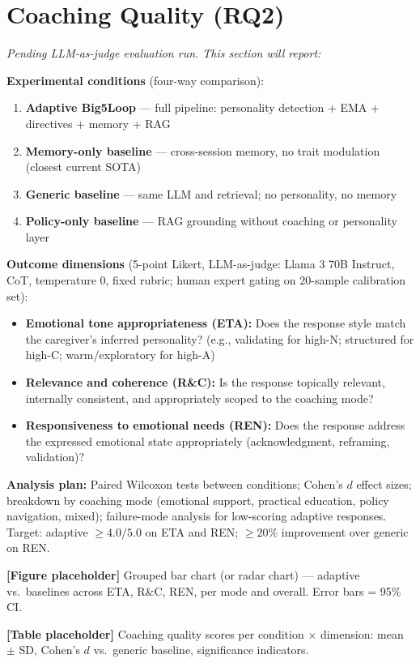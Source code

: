 \documentclass[10pt,a4paper]{report}
\begin{document}
\section{Coaching Quality (RQ2)}

\begin{tcolorbox}[colback=yellow!8!white, colframe=orange!70!black, title=\textbf{Placeholder --- Coaching Quality Evaluation (RQ2)}, fonttitle=\bfseries, left=4pt, right=4pt, top=4pt, bottom=4pt]
\textit{Pending LLM-as-judge evaluation run. This section will report:}

\textbf{Experimental conditions} (four-way comparison):
\begin{enumerate}[leftmargin=*, nosep]
  \item \textbf{Adaptive Big5Loop} --- full pipeline: personality detection + EMA + directives + memory + RAG
  \item \textbf{Memory-only baseline} --- cross-session memory, no trait modulation (closest current SOTA)
  \item \textbf{Generic baseline} --- same LLM and retrieval; no personality, no memory
  \item \textbf{Policy-only baseline} --- RAG grounding without coaching or personality layer
\end{enumerate}

\textbf{Outcome dimensions} (5-point Likert, LLM-as-judge: Llama 3 70B Instruct, CoT, temperature 0, fixed rubric; human expert gating on 20-sample calibration set):
\begin{itemize}[leftmargin=*, nosep]
  \item \textbf{Emotional tone appropriateness (ETA):} Does the response style match the caregiver's inferred personality? (e.g., validating for high-N; structured for high-C; warm/exploratory for high-A)
  \item \textbf{Relevance and coherence (R\&C):} Is the response topically relevant, internally consistent, and appropriately scoped to the coaching mode?
  \item \textbf{Responsiveness to emotional needs (REN):} Does the response address the expressed emotional state appropriately (acknowledgment, reframing, validation)?
\end{itemize}

\textbf{Analysis plan:} Paired Wilcoxon tests between conditions; Cohen's $d$ effect sizes; breakdown by coaching mode (emotional support, practical education, policy navigation, mixed); failure-mode analysis for low-scoring adaptive responses. Target: adaptive $\geq 4.0/5.0$ on ETA and REN; $\geq 20\%$ improvement over generic on REN.

\medskip
\textbf{[Figure placeholder]} Grouped bar chart (or radar chart) --- adaptive vs.\ baselines across ETA, R\&C, REN, per mode and overall. Error bars = 95\% CI.

\medskip
\textbf{[Table placeholder]} Coaching quality scores per condition $\times$ dimension: mean $\pm$ SD, Cohen's $d$ vs.\ generic baseline, significance indicators.
\end{tcolorbox}
\end{document}
